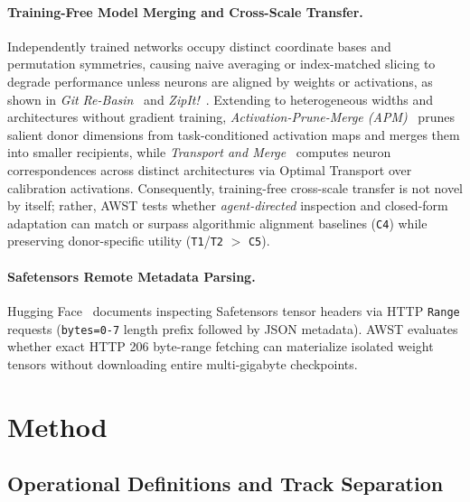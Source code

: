 \documentclass[11pt]{article}
\begin{document}
\paragraph{Training-Free Model Merging and Cross-Scale Transfer.}
Independently trained networks occupy distinct coordinate bases and permutation symmetries, causing naive averaging or index-matched slicing to degrade performance unless neurons are aligned by weights or activations, as shown in \emph{Git Re-Basin}~\cite{ainsworth2023gitrebasin} and \emph{ZipIt!}~\cite{stoica2024zipit}. Extending to heterogeneous widths and architectures without gradient training, \emph{Activation-Prune-Merge (APM)}~\cite{fan2026apm} prunes salient donor dimensions from task-conditioned activation maps and merges them into smaller recipients, while \emph{Transport and Merge}~\cite{cui2026transport} computes neuron correspondences across distinct architectures via Optimal Transport over calibration activations. Consequently, training-free cross-scale transfer is not novel by itself; rather, AWST tests whether \emph{agent-directed} inspection and closed-form adaptation can match or surpass algorithmic alignment baselines (\texttt{C4}) while preserving donor-specific utility (\texttt{T1}/\texttt{T2} $>$ \texttt{C5}).

\paragraph{Safetensors Remote Metadata Parsing.}
Hugging Face~\cite{huggingface2026safetensors} documents inspecting Safetensors tensor headers via HTTP \texttt{Range} requests (\texttt{bytes=0-7} length prefix followed by JSON metadata). AWST evaluates whether exact HTTP 206 byte-range fetching can materialize isolated weight tensors without downloading entire multi-gigabyte checkpoints.

\section{Method}

\subsection{Operational Definitions and Track Separation}
\end{document}
